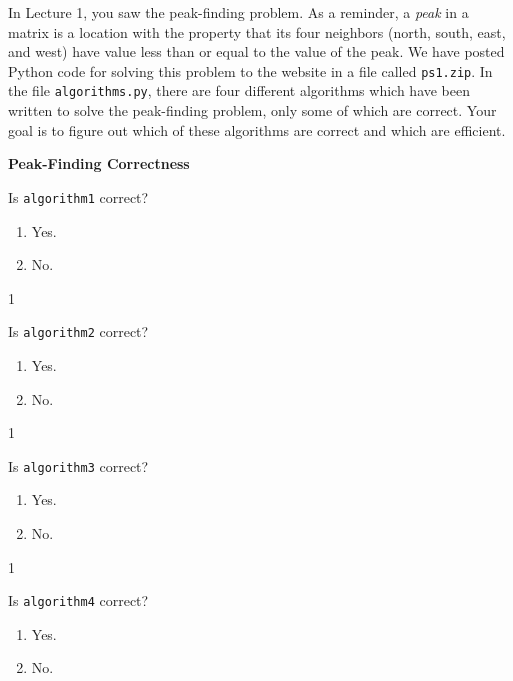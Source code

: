 \documentclass[12pt,twoside]{article}
\begin{document}
\begin{problems}
    In Lecture 1, you saw the peak-finding problem. As a reminder, a \emph{peak} in
    a matrix is a location with the property that its four neighbors (north, south,
    east, and west) have value less than or equal to the value of the peak. We have
    posted Python code for solving this problem to the website in a file called
    \texttt{ps1.zip}. In the file \texttt{algorithms.py}, there are four different
    algorithms which have been written to solve the peak-finding problem, only some
    of which are correct. Your goal is to figure out which of these algorithms are
    correct and which are efficient.

    \problem {} \textbf{Peak-Finding Correctness}

    \begin{problemparts}

        \problempart {} Is \texttt{algorithm1} correct?
        \begin{enumerate}
            \item Yes.
            \item No.
        \end{enumerate}

        \ifsolution \solution{}
            1
        \fi

        \problempart {} Is \texttt{algorithm2} correct?
        \begin{enumerate}
            \item Yes.
            \item No.
        \end{enumerate}

        \ifsolution \solution{}
            1
        \fi

        \problempart {} Is \texttt{algorithm3} correct?
        \begin{enumerate}
            \item Yes.
            \item No.
        \end{enumerate}

        \ifsolution \solution{}
            1
        \fi

        \problempart {} Is \texttt{algorithm4} correct?
        \begin{enumerate}
            \item Yes.
            \item No.
        \end{enumerate}


\end{problemparts}
\end{problems}
\end{document}
